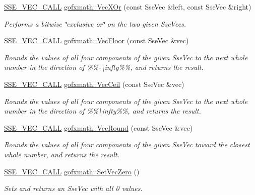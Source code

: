 \begin{DoxyCompactItemize}
\hyperlink{ssevec__math__defs_8h_a97454f977a5281455cecacce1e8ba670}{S\+S\+E\+\_\+\+V\+E\+C\+\_\+\+C\+A\+L\+L} \hyperlink{group___s_i_m_d_vec_math_gaf0e068289862b8f6cd6c3371798cba01}{gofxmath\+::\+Vec\+X\+Or} (const Sse\+Vec \&left, const Sse\+Vec \&right)
\begin{DoxyCompactList}\small\item\em Performs a bitwise \char`\"{}exclusive or\char`\"{} on the two given Sse\+Vecs. \end{DoxyCompactList}\item 
\hyperlink{ssevec__math__defs_8h_a97454f977a5281455cecacce1e8ba670}{S\+S\+E\+\_\+\+V\+E\+C\+\_\+\+C\+A\+L\+L} \hyperlink{group___s_i_m_d_vec_math_gac163833435974faa24c026a9709eb7d4}{gofxmath\+::\+Vec\+Floor} (const Sse\+Vec \&vec)
\begin{DoxyCompactList}\small\item\em Rounds the values of all four components of the given Sse\+Vec to the next whole number in the direction of \%\%-\/\textbackslash{}infty\%\%, and returns the result. \end{DoxyCompactList}\item 
\hyperlink{ssevec__math__defs_8h_a97454f977a5281455cecacce1e8ba670}{S\+S\+E\+\_\+\+V\+E\+C\+\_\+\+C\+A\+L\+L} \hyperlink{group___s_i_m_d_vec_math_ga8a1aa92fcef0713d09a19c8d3df476b8}{gofxmath\+::\+Vec\+Ceil} (const Sse\+Vec \&vec)
\begin{DoxyCompactList}\small\item\em Rounds the values of all four components of the given Sse\+Vec to the next whole number in the direction of \%\%\textbackslash{}infty\%\%, and returns the result. \end{DoxyCompactList}\item 
\hyperlink{ssevec__math__defs_8h_a97454f977a5281455cecacce1e8ba670}{S\+S\+E\+\_\+\+V\+E\+C\+\_\+\+C\+A\+L\+L} \hyperlink{group___s_i_m_d_vec_math_ga458ffba4de61723c646a36595a67d63c}{gofxmath\+::\+Vec\+Round} (const Sse\+Vec \&vec)
\begin{DoxyCompactList}\small\item\em Rounds the values of all four components of the given Sse\+Vec toward the closest whole number, and returns the result. \end{DoxyCompactList}\item 
\hyperlink{ssevec__math__defs_8h_a97454f977a5281455cecacce1e8ba670}{S\+S\+E\+\_\+\+V\+E\+C\+\_\+\+C\+A\+L\+L} \hyperlink{group___s_i_m_d_vec_math_ga85f7501f91a11ba01f589001a5e7b147}{gofxmath\+::\+Set\+Vec\+Zero} ()
\begin{DoxyCompactList}\small\item\em Sets and returns an Sse\+Vec with all 0 values. \end{DoxyCompactList}\item 

\end{DoxyCompactItemize}

